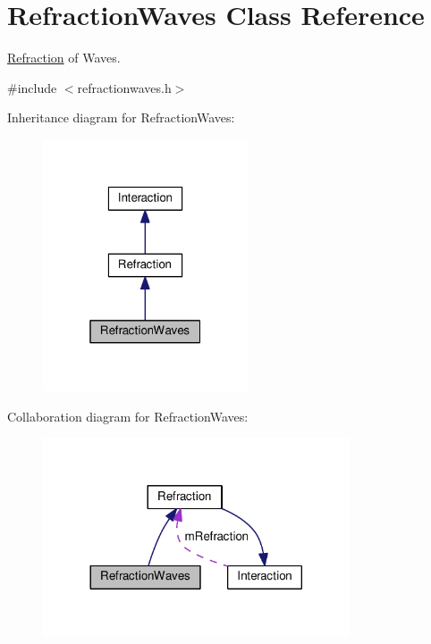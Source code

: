 \hypertarget{classRefractionWaves}{}\section{Refraction\+Waves Class Reference}
\label{classRefractionWaves}


\hyperlink{classRefraction}{Refraction} of Waves.  




{\ttfamily \#include $<$refractionwaves.\+h$>$}



Inheritance diagram for Refraction\+Waves\+:\nopagebreak
\begin{figure}[H]
\begin{center}
\leavevmode
\includegraphics[width=172pt]{classRefractionWaves__inherit__graph}
\end{center}
\end{figure}


Collaboration diagram for Refraction\+Waves\+:\nopagebreak
\begin{figure}[H]
\begin{center}
\leavevmode
\includegraphics[width=257pt]{classRefractionWaves__coll__graph}
\end{center}
\end{figure}
